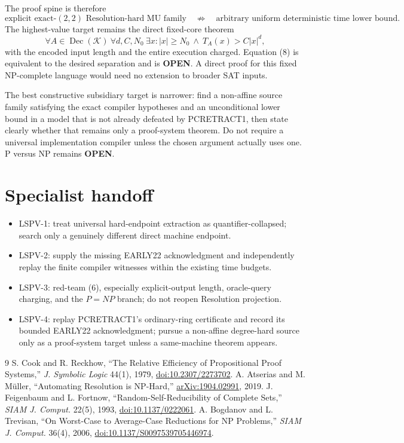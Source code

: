 \documentclass[11pt]{article}
\newcommand{\OPEN}{\textbf{OPEN}}
\begin{document}
The proof spine is therefore
\[
\boxed{\text{explicit exact-$(2,2)$ Resolution-hard MU family}}
\quad\not\Longrightarrow\quad
\boxed{\text{arbitrary uniform deterministic time lower bound}}.
\]
The highest-value target remains the direct fixed-core theorem
\[
 \forall A\in\operatorname{Dec}(\mathcal K)\ \forall d,C,N_0\ \exists x:
 |x|\ge N_0\ \land\ T_A(x)>C|x|^d,                         \tag{8}
\]
with the encoded input length and the entire execution charged.  Equation (8)
is equivalent to the desired separation and is \OPEN.  A direct proof for
this fixed NP-complete language would need no extension to broader SAT inputs.

The best constructive subsidiary target is narrower: find a non-affine source
family satisfying the exact compiler hypotheses and an unconditional lower
bound in a model that is not already defeated by PCRETRACT1, then state
clearly whether that remains only a proof-system theorem.  Do not require a
universal implementation compiler unless the chosen argument actually uses
one.  P versus NP remains \OPEN.

\section{Specialist handoff}
\begin{itemize}
\item LSPV-1: treat universal hard-endpoint extraction as quantifier-collapsed;
search only a genuinely different direct machine endpoint.
\item LSPV-2: supply the missing EARLY22 acknowledgment and independently
replay the finite compiler witnesses within the existing time budgets.
\item LSPV-3: red-team (6), especially explicit-output length, oracle-query
charging, and the $P=NP$ branch; do not reopen Resolution projection.
\item LSPV-4: replay PCRETRACT1's ordinary-ring certificate and record its
bounded EARLY22 acknowledgment; pursue a non-affine degree-hard source only
as a proof-system target unless a same-machine theorem appears.
\end{itemize}

\begin{thebibliography}{9}
S. Cook and R. Reckhow, ``The Relative Efficiency of Propositional Proof
Systems,'' \emph{J. Symbolic Logic} 44(1), 1979,
\href{https://doi.org/10.2307/2273702}{doi:10.2307/2273702}.
A. Atserias and M. M\"uller, ``Automating Resolution is NP-Hard,''
\href{https://arxiv.org/abs/1904.02991}{arXiv:1904.02991}, 2019.
J. Feigenbaum and L. Fortnow, ``Random-Self-Reducibility of Complete Sets,''
\emph{SIAM J. Comput.} 22(5), 1993,
\href{https://doi.org/10.1137/0222061}{doi:10.1137/0222061}.
A. Bogdanov and L. Trevisan, ``On Worst-Case to Average-Case Reductions for NP
Problems,'' \emph{SIAM J. Comput.} 36(4), 2006,
\href{https://doi.org/10.1137/S0097539705446974}{doi:10.1137/S0097539705446974}.
\end{thebibliography}

\end{document}
